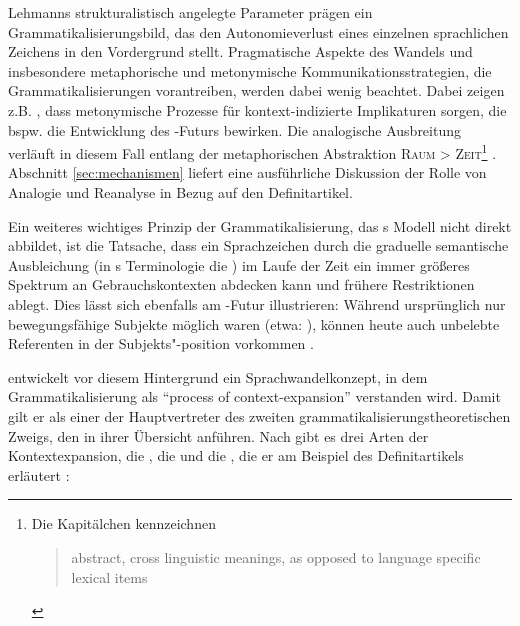 Lehmanns strukturalistisch angelegte Parameter prägen ein Grammatikalisierungsbild, das den Autonomieverlust eines einzelnen sprachlichen Zeichens in den Vordergrund stellt. Pragmatische Aspekte des Wandels und insbesondere metaphorische und metonymische Kommunikationsstrategien, die Grammatikalisierungen vorantreiben, werden dabei wenig beachtet. Dabei zeigen z.B. \textcite[84--93]{Hopper2006}, dass metonymische Prozesse für kontext-indizierte Implikaturen sorgen, die bspw. die Entwicklung des -Futurs bewirken. Die analogische Ausbreitung verläuft in diesem Fall entlang der metaphorischen Abstraktion \textsc{Raum > Zeit}\footnote{Die Kapitälchen kennzeichnen \blockcquote[85]{Hopper2006}{abstract, cross linguistic meanings, as opposed to language specific lexical items}.} \parencite[s. auch][45--46]{Heine1991}. Abschnitt \ref{sec:mechanismen} liefert eine ausführliche Diskussion der Rolle von Analogie und Reanalyse in Bezug auf den Definitartikel. 

Ein weiteres wichtiges Prinzip der Grammatikalisierung, das \citeauthor{Lehmann1995}s Modell nicht direkt abbildet, ist die Tatsache, dass ein Sprachzeichen durch die graduelle semantische Ausbleichung  (in \citeauthor{Lehmann1995}s  Terminologie die ) im Laufe der Zeit ein immer größeres Spektrum an Gebrauchskontexten abdecken kann und frühere Restriktionen ablegt. Dies lässt sich ebenfalls am -Futur illustrieren: Während ursprünglich  nur bewegungsfähige Subjekte möglich waren (etwa: ), können heute auch unbelebte Referenten in der Subjekts"-position vorkommen \parencite[etwa: ; Beispiele nach][5--6]{Bybee1994}. 

\textcite{Himmelmann1997,Himmelmann2004} entwickelt vor diesem Hintergrund ein Sprachwandelkonzept, in dem Grammatikalisierung als "`process of context-expansion"'\linebreak \parencite[32]{Himmelmann2004} verstanden wird. Damit gilt er als einer der Hauptvertreter des zweiten grammatikalisierungstheoretischen Zweigs, den \textcite[105--109]{Traugott2013} in ihrer Übersicht anführen. Nach \citeauthor{Himmelmann2004} gibt es drei Arten der Kontextexpansion, die , die  und die , die er am Beispiel des Definitartikels erläutert \parencite[s.][32--33]{Himmelmann2004}: 


